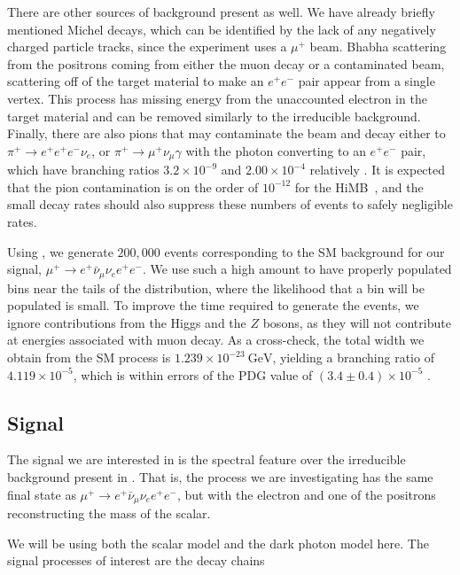 There are other sources of background present as well.
We have already briefly mentioned Michel decays, which can be identified by the lack of any negatively charged particle tracks, since the experiment uses a $\mu^+$ beam.
Bhabha scattering from the positrons coming from either the muon decay or a contaminated beam, scattering off of the target material to make an $e^+ e^-$ pair appear from a single vertex.
This process has missing energy from the unaccounted electron in the target material and can be removed similarly to the irreducible background.
Finally, there are also pions that may contaminate the beam and decay either to $\pi^+ \rightarrow e^+ e^+ e^- \nu_e$, or $\pi^+ \rightarrow \mu^+ \nu_\mu \gamma$ with the photon converting to an $e^+ e^-$ pair, which have branching ratios $3.2 \times 10^{-9}$ and $2.00 \times 10^{-4}$ relatively \cite{Agashe:2014kda}.
It is expected that the pion contamination is on the order of $10^{-12}$ for the HiMB~\cite{Blondel:2013ia}, and the small decay rates should also suppress these numbers of events to safely negligible rates.

Using \madgraph, we generate $200,000$ events corresponding to the SM background for our signal, $\mu^+ \rightarrow e^+ \bar{\nu}_\mu \nu_e e^+ e^-$.
We use such a high amount to have properly populated bins near the tails of the distribution, where the likelihood that a bin will be populated is small.
To improve the time required to generate the events, we ignore contributions from the Higgs and the $Z$ bosons, as they will not contribute at energies associated with muon decay.
As a cross-check, the total width we obtain from the SM process is $1.239\times 10^{-23}~\textrm{GeV}$, yielding a branching ratio of $4.119\times 10^{-5}$, which is within errors of the PDG value of $(3.4 \pm 0.4) \times 10^{-5}$ \cite{Agashe:2014kda}.

\subsection{Signal}
The signal we are interested in is the spectral feature over the irreducible background present in \mueee.
That is, the process we are investigating has the same final state as $\mu^+ \rightarrow e^+ \bar{\nu}_\mu \nu_e e^+ e^-$, but with the electron and one of the positrons reconstructing the mass of the scalar.

We will be using both the scalar model and the dark photon model here.
The signal processes of interest are the decay chains

